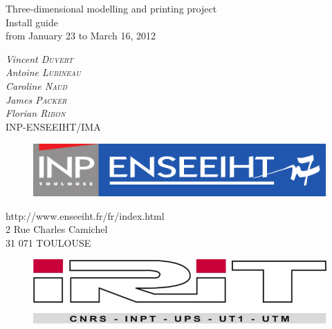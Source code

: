 \documentclass{article}
\begin{document}
\sloppy

\vfill

\begin{center}
	{\Large Three-dimensional modelling and printing project}\\
	\bigskip
	{\Huge Install guide}\\
	\bigskip
	{\Large from January 23 to March 16, 2012}
\end{center}

\bigskip
\bigskip

\begin{center}
\large{
\textit{Vincent \textsc{Duvert} \\
Antoine \textsc{Lubineau} \\
Caroline \textsc{Naud} \\
James \textsc{Packer} \\
Florian \textsc{Ribon}} \\
\bigskip
INP-ENSEEIHT/IMA 
}
\end{center}

\vfill

\begin{figure}[!h]
\begin{center}
	\includegraphics[scale=0.4]{inp-enseeiht}
\end{center}
\end{figure}

\bigskip

\begin{center}
http://www.enseeiht.fr/fr/index.html \\
2 Rue Charles Camichel \\
31 071 TOULOUSE
\end{center}

\vfill

\begin{figure}[!h]
\begin{center}
	\includegraphics[scale=0.4]{irit}
\end{center}
\end{figure}
\end{document}
